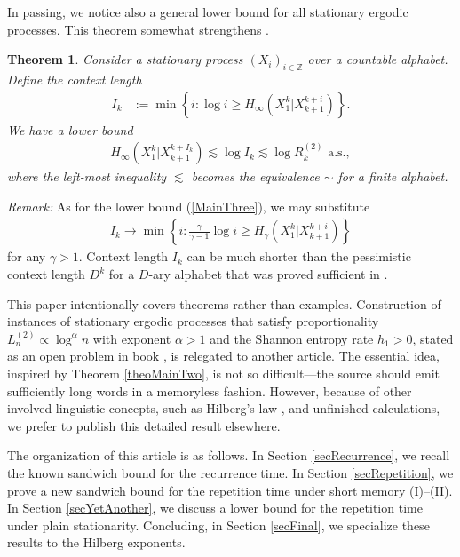 \documentclass[a4paper,12pt]{article}
\newcommand{\klam}[1]{\left\{ #1 \right\}}
\newtheorem{theorem}{Theorem}
\begin{document}
In passing, we notice also a general lower bound for all stationary
ergodic processes. This theorem somewhat strengthens \citep[Theorem
8]{Debowski18b}.
\begin{theorem}
  \label{theoMainThree} 
  Consider a stationary process $(X_i)_{i\in\mathbb{Z}}$ over a
  countable alphabet. Define the context length
    \begin{align}
      \label{ContextLength}
      I_k&:=\min\klam{i:\log i\ge H_\infty(X_1^k|X_{k+1}^{k+i})}.
    \end{align}
    We have a lower bound
    \begin{align}
      \label{MainThree}
      H_\infty(X_1^k|X_{k+1}^{k+I_k})\lesssim
      \log I_k\lesssim
      \log R^{(2)}_k
      \text{ a.s.}
      ,
    \end{align}
    where the left-most inequality $\lesssim$ becomes the equivalence
    $\sim$ for a finite alphabet.  
\end{theorem}
\emph{Remark:} As for the lower bound (\ref{MainThree}), we may
substitute
\begin{align*}
  I_k\to\min\klam{i:\frac{\gamma}{\gamma-1}\log i\ge
  H_\gamma(X_1^k|X_{k+1}^{k+i})}
\end{align*}
for any $\gamma>1$.  Context length $I_k$ can be much shorter than the
pessimistic context length $D^k$ for a $D$-ary alphabet that was
proved sufficient in \citep[Theorem 8]{Debowski18b}.

This paper intentionally covers theorems rather than examples.
Construction of instances of stationary ergodic processes that satisfy
proportionality $L^{(2)}_n\propto \log^\alpha n$ with exponent
$\alpha>1$ and the Shannon entropy rate $h_1>0$, stated as an open
problem in book \citep{Debowski21}, is relegated to another
article. The essential idea, inspired by Theorem \ref{theoMainTwo}, is
not so difficult---the source should emit sufficiently long words in a
memoryless fashion. However, because of other involved linguistic
concepts, such as Hilberg's law \citep{Hilberg90, TakahiraOthers16,
  KaplanOther20, Debowski21}, and unfinished calculations, we prefer
to publish this detailed result elsewhere.

The organization of this article is as follows. In Section
\ref{secRecurrence}, we recall the known sandwich bound for the
recurrence time. In Section \ref{secRepetition}, we prove a new
sandwich bound for the repetition time under short memory
(I)--(II). In Section \ref{secYetAnother}, we discuss a lower bound for
the repetition time under plain stationarity.  Concluding, in Section
\ref{secFinal}, we specialize these results to the Hilberg exponents.
\end{document}
